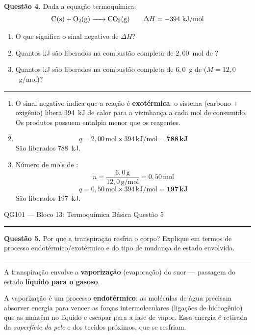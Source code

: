 \documentclass[10pt,a4paper]{article}
\newcommand{\questaoheader}[1]{%
  \begin{center}
  {\small\sffamily QG101 --- Bloco 13: Termoquímica Básica
  \hfill Questão #1}
  \end{center}
  \vspace{-0.3cm}
  \noindent\rule{\textwidth}{0.6pt}
  \vspace{0.1cm}
}
\newcommand{\resolucaosep}{%
  \vspace{0.4cm}
  \noindent\rule{\textwidth}{0.4pt}
  \vspace{0.1cm}

  \noindent{\bf Resolução:}
  \vspace{0.2cm}
}
\begin{document}
\noindent\textbf{Questão 4.}
Dada a equação termoquímica:
$$\ce{C(s) + O2(g) -> CO2(g)} \qquad \Delta H = -394~\text{kJ/mol}$$
\begin{enumerate}
  \item O que significa o sinal negativo de $\Delta H$?
  \item Quantos kJ são liberados na combustão completa de $2{,}00$~mol de
        ?
  \item Quantos kJ são liberados na combustão completa de $6{,}0$~g de
         ($M = 12{,}0$~g/mol)?
\end{enumerate}

\resolucaosep

\begin{enumerate}
  \item O sinal negativo indica que a reação é \textbf{exotérmica}: o
        sistema (carbono + oxigênio) libera 394~kJ de calor para a
        vizinhança a cada mol de  consumido. Os produtos possuem
        entalpia menor que os reagentes.

  \item
  \[
    q = 2{,}00\,\text{mol} \times 394\,\text{kJ/mol}
      = \mathbf{788\,\text{kJ}}
  \]
  São liberados 788~kJ.

  \item Número de mols de :
  \[
    n = \frac{6{,}0\,\text{g}}{12{,}0\,\text{g/mol}} = 0{,}50\,\text{mol}
  \]
  \[
    q = 0{,}50\,\text{mol} \times 394\,\text{kJ/mol}
      = \mathbf{197\,\text{kJ}}
  \]
  São liberados 197~kJ.
\end{enumerate}

\clearpage

\questaoheader{5}

\noindent\textbf{Questão 5.}
Por que a transpiração resfria o corpo? Explique em termos de processo
endotérmico/exotérmico e do tipo de mudança de estado envolvida.

\resolucaosep

A transpiração envolve a \textbf{vaporização} (evaporação) do suor ---
passagem do estado \textbf{líquido para o gasoso}.

A vaporização é um processo \textbf{endotérmico}: as moléculas de água
precisam absorver energia para vencer as forças intermoleculares
(ligações de hidrogênio) que as mantêm no líquido e escapar para a fase
de vapor. Essa energia é retirada da \emph{superfície da pele} e dos
tecidos próximos, que se resfriam.
\end{document}
